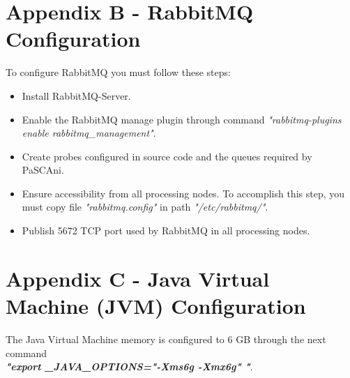 \clearpage
\section{Appendix B - RabbitMQ Configuration}
\label{sec:appendB}
To configure RabbitMQ you must follow these steps:
\begin{itemize}
	\item Install RabbitMQ-Server.
	\item Enable the RabbitMQ manage plugin through command \textit{"rabbitmq-plugins enable rabbitmq\_management"}.
	\item Create probes configured in source code and the queues required by PaSCAni.
	\item Ensure accessibility from all processing nodes. To accomplish this step, you must copy file \textit{"rabbitmq.config"} in path \textit{"/etc/rabbitmq/"}.
	\item Publish 5672 TCP port used by RabbitMQ in all processing nodes.
\end{itemize}

\clearpage
\section{Appendix C - Java Virtual Machine (JVM) Configuration}
\label{sec:appendC}
The Java Virtual Machine memory is configured to 6 GB through the next command \\

\textbf{\textit{"export \_JAVA\_OPTIONS="-Xms6g -Xmx6g" "}}.
